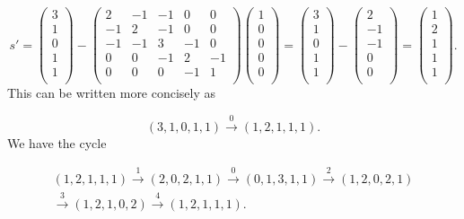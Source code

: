 \begin{example}
{\[
s'=
\left(
\begin{array}{c}
3 \\
1 \\
0 \\
1 \\
1  \\
\end{array}
\right)
-
\left(
\begin{array}{ccccc}
2 & -1 & -1 & 0 & 0 \\
-1 & 2 & -1 & 0 & 0 \\
-1 & -1 & 3 & -1 & 0 \\
0 & 0 & -1 & 2 & -1 \\
0 & 0 & 0 &  -1  &  1  \\
\end{array}
\right)
\left(
\begin{array}{c}
1 \\
0 \\
0 \\
0 \\
0  \\
\end{array}
\right)
=
\left(
\begin{array}{c}
3 \\
1 \\
0 \\
1 \\
1  \\
\end{array}
\right)
-
\left(
\begin{array}{c}
2 \\
-1 \\
-1 \\
0 \\
0  \\
\end{array}
\right)
=
\left(
\begin{array}{c}
1 \\
2 \\
1 \\
1 \\
1  \\
\end{array}
\right).
\]
This can be written more concisely as

\[
(3,1,0,1,1)\overset{0}{\to} (1,2,1,1,1).
\]
We have the cycle

\[
\begin{array}{c}
(1,2,1,1,1)
\overset{1}{\to} (2,0,2,1,1)
\overset{0}{\to} (0,1,3,1,1)
\overset{2}{\to} (1,2,0,2,1)\\
\overset{3}{\to} (1,2,1,0,2)
\overset{4}{\to} (1,2,1,1,1).
\end{array}
\]



}
\end{example}


